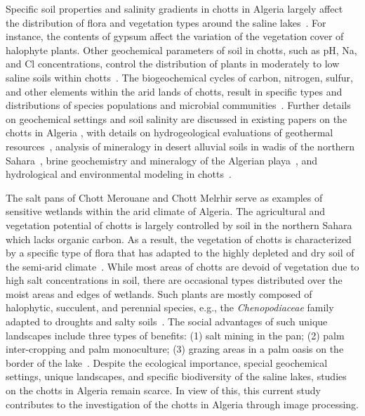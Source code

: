 \documentclass[asi,article,accept,pdftex,moreauthors]{Definitions/mdpi}
\begin{document}
Specific soil properties and salinity gradients in chotts in Algeria largely affect the distribution of flora and vegetation types around the saline lakes~\cite{Neffar}. For instance, the contents of gypsum {affect the }variation of {the }vegetation cover of halophyte plants. Other geochemical parameters of soil in chotts, such as pH, Na, and Cl concentrations, control the distribution of plants in moderately to low saline soils within chotts~\cite{CHENCHOUNI2017660}. The biogeochemical cycles of carbon, nitrogen, sulfur, and other elements within {the }arid lands of chotts, result in specific types and distributions of species populations and microbial  communities~\cite{BOUTAIBA2011909,QUADRI2016119}. {Further} details on geochemical settings and soil salinity {are discussed in } existing papers on the chotts in Algeria \cite{Abdennour}, {with details on} hydrogeological evaluations of {}geothermal resources~\cite{BENMARCE2021104285,MELOUAH2021102211,Abdelaziz}, analysis of mineralogy in desert alluvial soils in wadis of the northern Sahara~\cite{Djili}, brine geochemistry and mineralogy of the Algerian playa~\cite{HamdiAissa,Valles}, and hydrological and environmental modeling in chotts~\cite{Samie}.

{The salt }pans of {}Chott Merouane and Chott Melrhir serve as examples of sensitive wetlands within the {}arid climate {of Algeria}. {The} agricultural and vegetation potential {of chotts is largely controlled by soil in} the northern Sahara {which lacks} organic carbon. {As a result, the vegetation of chotts is characterized by a} specific type of flora that has adapted to the highly depleted and dry soil of the semi-arid climate~\cite{BOUBEHZIZ2020104539}. While  most areas of chotts are devoid of vegetation due to high salt concentrations in soil, there are occasional types distributed over the moist areas and edges of wetlands. {Such} plants are mostly composed of halophytic, succulent, and perennial species{, e.g.,} the \emph{Chenopodiaceae} family adapted to droughts and salty soils~\cite{KHAZNADAR2009369}. The social {advantages} of such unique landscapes include {three} types of benefits: (1) salt mining in the pan; (2) palm inter-cropping and palm monoculture; (3) grazing areas in a palm oasis on the border of the lake~\cite{Demnati2012}. Despite the ecological importance, special geochemical settings, unique landscapes, and specific biodiversity {of the saline lakes, }studies on the chotts in Algeria remain scarce. In view of this, this current study contributes to the investigation of the chotts in Algeria through image processing. 
\end{document}
